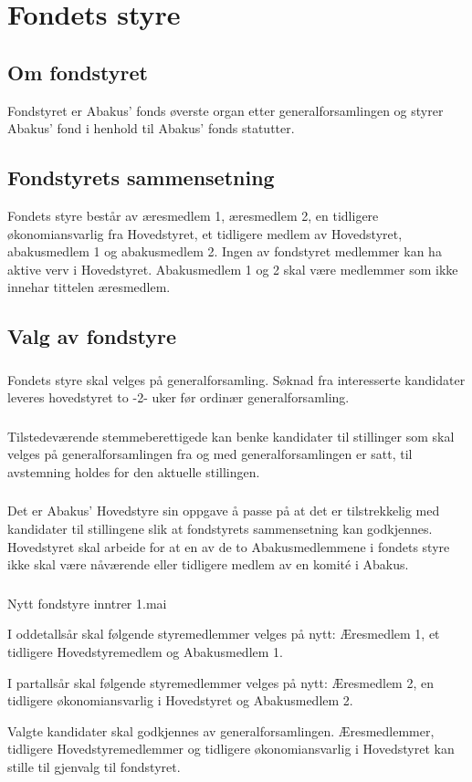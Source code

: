 \section{Fondets styre}
\subsection{Om fondstyret}
Fondstyret er Abakus’ fonds øverste organ etter generalforsamlingen og styrer
Abakus’ fond i henhold til Abakus’ fonds statutter.

\subsection{Fondstyrets sammensetning}
Fondets styre består av æresmedlem 1, æresmedlem 2, en tidligere økonomiansvarlig fra
Hovedstyret, et tidligere medlem av Hovedstyret, abakusmedlem 1 og abakusmedlem 2.
Ingen av fondstyret medlemmer kan ha aktive verv i Hovedstyret. Abakusmedlem 1 og 2 skal
være medlemmer som ikke innehar tittelen æresmedlem.

\subsection{Valg av fondstyre}
\subsubsection{}
Fondets styre skal velges på generalforsamling. Søknad fra interesserte kandidater
leveres hovedstyret to -2- uker før ordinær generalforsamling.

\subsubsection{}
Tilstedeværende stemmeberettigede kan benke kandidater til stillinger som skal velges
på generalforsamlingen fra og med generalforsamlingen er satt, til avstemning holdes for
den aktuelle stillingen.

\subsubsection{}
Det er Abakus’ Hovedstyre sin oppgave å passe på at det er tilstrekkelig med kandidater til
stillingene slik at fondstyrets sammensetning kan godkjennes. Hovedstyret skal arbeide for
at en av de to Abakusmedlemmene i fondets styre ikke skal være nåværende eller tidligere
medlem av en komité i Abakus.

\subsubsection{}
Nytt fondstyre inntrer 1.mai

I oddetallsår skal følgende styremedlemmer velges på nytt: Æresmedlem 1, et tidligere
Hovedstyremedlem og Abakusmedlem 1.

I partallsår skal følgende styremedlemmer velges på nytt: Æresmedlem 2, en tidligere
økonomiansvarlig i Hovedstyret og Abakusmedlem 2.

Valgte kandidater skal godkjennes av generalforsamlingen. Æresmedlemmer,
tidligere Hovedstyremedlemmer og tidligere økonomiansvarlig i Hovedstyret kan
stille til gjenvalg til fondstyret.
